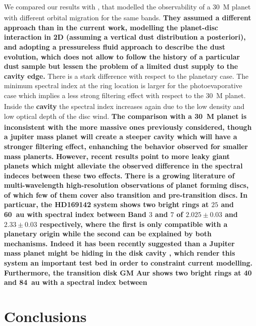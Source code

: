 \documentclass[fleqn,usenatbib]{mnras}
\begin{document}
    We compared our results with \citet{Nazari_2019}, that modelled the observability of a \SI{30}{M_\oplus} planet with different orbital migration for the same bands.
    \textbf{They assumed a different approach than in the current work, modelling the planet-disc interaction in 2D (assuming a vertical dust distribution a posteriori), and adopting a pressureless fluid approach to describe the dust evolution, which does not allow to follow the history of a particular dust sample but lessen the problem of a limited dust supply to the cavity edge.} 
    There is a stark difference with respect to the planetary case. 
    The minimum spectral index at the ring location is larger for the photoevaporative case which implies a less strong filtering effect with respect to the \SI{30}{M_\oplus} planet. 
    Inside the \textbf{cavity} the spectral index increases again due to the low density and low optical depth of the disc wind.%
    \textbf{The comparison with a \SI{30}{M_\oplus} planet is inconsistent with the more massive ones previously considered, though a jupiter mass planet will create a steeper cavity which will have a stronger filtering effect, enhanching the behavior observed for smaller mass planerts.}
    \textbf{However, recent results point to more leaky giant planets \citep[see e.g.][]{Stammler2023} which might alleviate the observed difference in the spectral indeces between these two effects.}
    \textbf{There is a growing literature of multi-wavelength high-resolution observations of planet forming discs, of which few of them cover also transition and pre-transition discs.} 
    \textbf{In particuar, the HD169142 system \citep{Macias2019} shows two bright rings at $25$ and \SI{60}{au} with spectral index between Band $3$ and $7$ of $2.025\pm0.03$ and $2.33\pm0.03$ respectively, where the first is only compatible with a planetary origin while the second can be explained by both mechanisms. Indeed it has been recently suggested than a Jupiter mass planet might be hiding in the disk cavity \citep{Hammond2023}, which render this system an important test bed in order to constraint current modelling.} 
    \textbf{Furthermore, the transition disk GM Aur \citep{Huang2020} shows two bright rings at 40 and \SI{84}{au} with a spectral index between }

\section{Conclusions} \label{sec:conclusions}
\end{document}
